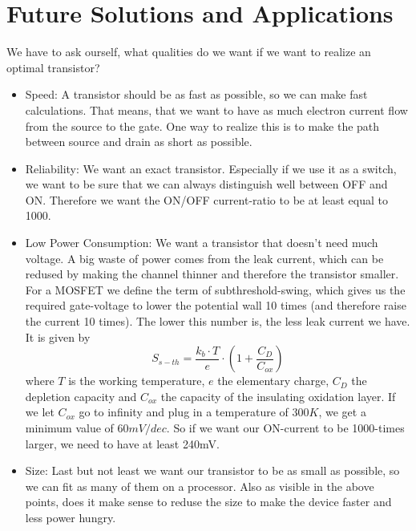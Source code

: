 \documentclass[11pt]{article}
\begin{document}
\section{Future Solutions and Applications}
We have to ask ourself, what qualities do we want if we want to realize an optimal transistor?
\begin{itemize}
 \item Speed: A transistor should be as fast as possible, so we can make fast calculations. That means, that we want to have as much electron current flow from the source to the gate. One way to realize this is to make the path between source and drain as short as possible.
 \item Reliability: We want an exact transistor. Especially if we use it as a switch, we want to be sure that we can always distinguish well between OFF and ON. Therefore we want the ON/OFF current-ratio to be at least equal to 1000. 
 \item Low Power Consumption: We want a transistor that doesn't need much voltage. A big waste of power comes from the leak current, which can be redused by making the channel thinner and therefore the transistor smaller.  For a MOSFET we define the term of subthreshold-swing, which gives us the required gate-voltage to lower the potential wall 10 times (and therefore raise the current 10 times). The lower this number is, the less leak current we have. It is given by 
 \begin{equation}
 S_{s-th}=\frac{k_b\cdot T}{e}\cdot(1+\frac{C_D}{C_{ox}})
 \label{eq:subthresholdswing}
 \end{equation}
 where $T$ is the working temperature, $e$ the elementary charge, $C_D$ the depletion capacity and $C_{ox}$ the capacity of the insulating oxidation layer. If we let $C_{ox}$ go to infinity and plug in a temperature of $300K$, we get a minimum value of $60mV/dec$. So if we want our ON-current to be 1000-times larger, we need to have at least 240mV. 
 \item Size: Last but not least we want our transistor to be as small as possible, so we can fit as many of them on a processor. Also as visible in the above points, does it make sense to reduse the size to make the device faster and less power hungry.
\end{itemize}
\end{document}

